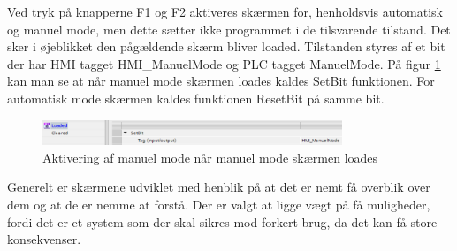 Ved tryk på knapperne F1 og F2 aktiveres skærmen for, henholdsvis automatisk og manuel mode, men dette sætter ikke programmet i de tilsvarende tilstand. Det sker i øjeblikket den pågældende skærm bliver loaded. Tilstanden styres af et bit der har HMI tagget HMI\_ManuelMode og PLC tagget ManuelMode. På figur \ref{fig:LoadManuelModeSkaerm} kan man se at når manuel mode skærmen loades kaldes SetBit funktionen. For automatisk mode skærmen kaldes funktionen ResetBit på samme bit.

\begin{figure}[H] %
	\centering
	\includegraphics[width=0.8\textwidth]{Figure/LoadManuelModeSkaerm}
	\caption{Aktivering af manuel mode når manuel mode skærmen loades}
	\label{fig:LoadManuelModeSkaerm}
\end{figure}

Generelt er skærmene udviklet med henblik på at det er nemt få overblik over dem og at de er nemme at forstå. Der er valgt at ligge vægt på få muligheder, fordi det er et system som der skal sikres mod forkert brug, da det kan få store konsekvenser.
